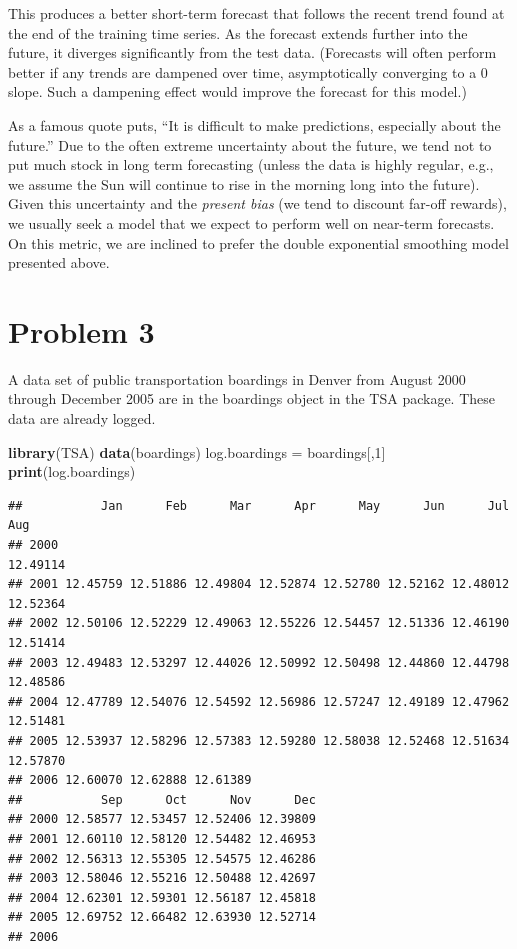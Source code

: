 \documentclass[
]{article}
\newenvironment{Shaded}{\begin{snugshade}}{\end{snugshade}}
\newcommand{\DecValTok}[1]{\textcolor[rgb]{0.00,0.00,0.81}{#1}}
\newcommand{\FunctionTok}[1]{\textcolor[rgb]{0.13,0.29,0.53}{\textbf{#1}}}
\newcommand{\NormalTok}[1]{#1}
\newcommand{\OtherTok}[1]{\textcolor[rgb]{0.56,0.35,0.01}{#1}}
\begin{document}
This produces a better short-term forecast that follows the recent trend
found at the end of the training time series. As the forecast extends
further into the future, it diverges significantly from the test data.
(Forecasts will often perform better if any trends are dampened over
time, asymptotically converging to a \(0\) slope. Such a dampening
effect would improve the forecast for this model.)

As a famous quote puts, ``It is difficult to make predictions,
especially about the future.'' Due to the often extreme uncertainty
about the future, we tend not to put much stock in long term forecasting
(unless the data is highly regular, e.g., we assume the Sun will
continue to rise in the morning long into the future). Given this
uncertainty and the \emph{present bias} (we tend to discount far-off
rewards), we usually seek a model that we expect to perform well on
near-term forecasts. On this metric, we are inclined to prefer the
double exponential smoothing model presented above.

\hypertarget{problem-3}{%
\section{Problem 3}\label{problem-3}}

A data set of public transportation boardings in Denver from August 2000
through December 2005 are in the boardings object in the TSA package.
These data are already logged.

\begin{Shaded}
\begin{Highlighting}[]
\FunctionTok{library}\NormalTok{(TSA)}
\FunctionTok{data}\NormalTok{(boardings)}
\NormalTok{log.boardings }\OtherTok{=}\NormalTok{ boardings[,}\DecValTok{1}\NormalTok{]}
\FunctionTok{print}\NormalTok{(log.boardings)}
\end{Highlighting}
\end{Shaded}

\begin{verbatim}
##           Jan      Feb      Mar      Apr      May      Jun      Jul      Aug
## 2000                                                                12.49114
## 2001 12.45759 12.51886 12.49804 12.52874 12.52780 12.52162 12.48012 12.52364
## 2002 12.50106 12.52229 12.49063 12.55226 12.54457 12.51336 12.46190 12.51414
## 2003 12.49483 12.53297 12.44026 12.50992 12.50498 12.44860 12.44798 12.48586
## 2004 12.47789 12.54076 12.54592 12.56986 12.57247 12.49189 12.47962 12.51481
## 2005 12.53937 12.58296 12.57383 12.59280 12.58038 12.52468 12.51634 12.57870
## 2006 12.60070 12.62888 12.61389                                             
##           Sep      Oct      Nov      Dec
## 2000 12.58577 12.53457 12.52406 12.39809
## 2001 12.60110 12.58120 12.54482 12.46953
## 2002 12.56313 12.55305 12.54575 12.46286
## 2003 12.58046 12.55216 12.50488 12.42697
## 2004 12.62301 12.59301 12.56187 12.45818
## 2005 12.69752 12.66482 12.63930 12.52714
## 2006
\end{verbatim}
\end{document}
